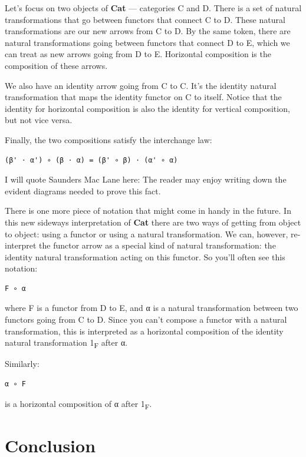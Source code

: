 Let's focus on two objects of \textbf{Cat} --- categories C and D. There
is a set of natural transformations that go between functors that
connect C to D. These natural transformations are our new arrows from C
to D. By the same token, there are natural transformations going between
functors that connect D to E, which we can treat as new arrows going
from D to E. Horizontal composition is the composition of these arrows.

We also have an identity arrow going from C to C. It's the identity
natural transformation that maps the identity functor on C to itself.
Notice that the identity for horizontal composition is also the identity
for vertical composition, but not vice versa.

Finally, the two compositions satisfy the interchange law:

\begin{verbatim}
(β' ⋅ α') ∘ (β ⋅ α) = (β' ∘ β) ⋅ (α' ∘ α)
\end{verbatim}

I will quote Saunders Mac Lane here: The reader may enjoy writing down
the evident diagrams needed to prove this fact.

There is one more piece of notation that might come in handy in the
future. In this new sideways interpretation of \textbf{Cat} there are
two ways of getting from object to object: using a functor or using a
natural transformation. We can, however, re-interpret the functor arrow
as a special kind of natural transformation: the identity natural
transformation acting on this functor. So you'll often see this
notation:

\begin{verbatim}
F ∘ α
\end{verbatim}

where F is a functor from D to E, and α is a natural transformation
between two functors going from C to D. Since you can't compose a
functor with a natural transformation, this is interpreted as a
horizontal composition of the identity natural transformation
1\textsubscript{F} after α.

Similarly:

\begin{verbatim}
α ∘ F
\end{verbatim}

is a horizontal composition of α after 1\textsubscript{F}.

\section{Conclusion}\label{conclusion}

